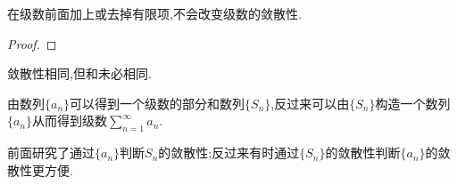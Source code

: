 \begin{proposition}
    在级数前面加上或去掉有限项,不会改变级数的敛散性.
\end{proposition}

\begin{proof}%
    
\end{proof}

\begin{remark}
    敛散性相同,但和未必相同.
\end{remark}

由数列$\{a_n\}$可以得到一个级数的部分和数列$\{S_n\}$,反过来可以由$\{S_n\}$构造一个数列$\{a_n\}$从而得到级数$\sum_{n=1}^\infty a_n$.

前面研究了通过$\{a_n\}$判断$S_n$的敛散性;反过来有时通过$\{S_n\}$的敛散性判断$\{a_n\}$的敛散性更方便.